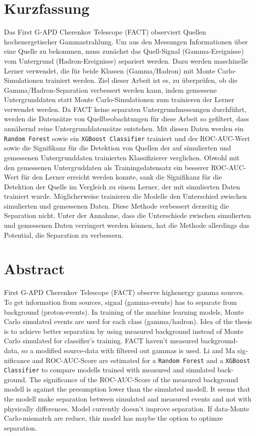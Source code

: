 \thispagestyle{plain}

\section*{Kurzfassung}
Das First G-APD Cherenkov Telescope (FACT) observiert Quellen hochenergetischer Gammastrahlung.
Um aus den Messungen Informationen über eine Quelle zu bekommen, muss zunächst das Quell-Signal (Gamma-Ereignisse) vom Untergrund (Hadron-Ereignisse) separiert werden.
Dazu werden maschinelle Lerner verwendet, die für beide Klassen (Gamma/Hadron) mit Monte Carlo-Simulationen trainiert werden.
Ziel dieser Arbeit ist es, zu überprüfen, ob die Gamma/Hadron-Separation verbessert werden kann, indem gemessene Untergrunddaten statt Monte Carlo-Simulationen zum trainieren der Lerner verwendet werden.
Da FACT keine separaten Untergrundmessungen durchführt, werden die Datensätze von Quellbeobachtungen für diese Arbeit so gefiltert, dass annähernd reine Untergrunddatensätze entstehen.
Mit diesen Daten werden ein \texttt{Random Forest} sowie ein \texttt{XGBoost Classifier} trainiert und der ROC-AUC-Wert sowie die Signifikanz für die Detektion von Quellen der auf simulierten und gemessenen Untergrunddaten trainierten Klassifizierer verglichen. 
Obwohl mit den gemessenen Untergruddaten als Trainingsdatensatz ein besserer ROC-AUC-Wert für den Lerner erreicht werden konnte, sank die Signifikanz für die Detektion der Quelle im Vergleich zu einem Lerner, der mit simulierten Daten trainiert wurde. 
Möglicherweise trainieren die Modelle den Unterschied zwischen simulierten und gemessenen Daten. 
Diese Methode verbessert derzeitig die Separation nicht. 
Unter der Annahme, dass die Unterschiede zwischen simulierten und gemessenen Daten verringert werden können, hat die Methode allerdings das Potential, die Separation zu verbessern. 
\section*{Abstract}
\begin{english}
First G-APD Cherenkov Telescope (FACT) observe highenergy gamma sources.
To get information from sources, signal (gamma-events) has to separate from background (proton-events). 
In training of the machine learning models, Monte Carlo simulated events are used for each class (gamma/hadron).
Idea of the thesis is to achieve better separation by using measured background instead of Monte Carlo simulated for classifier's training.
FACT haven't measured background-data, so a modified source-data with filtered out gammas is used.
Li and Ma significance and ROC-AUC-Score are estimated for a \texttt{Random Forest} and a \texttt{XGBoost Classifier} to compare modells trained with measured and simulated background.
The significance of the ROC-AUC-Score of the measured background modell is against the presumption lower than the simulated modell.
It seems that the modell make separation between simulated and measured events and not with physically differences.
Model currently doesn't improve separation.
If data-Monte Carlo-mismatch are reduce, this model has maybe the option to optimze separation.
\end{english}
